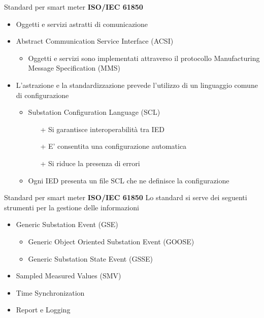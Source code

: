 \begin{frame}{Standard per smart meter}
\textbf{ISO/IEC 61850}
	\begin{itemize}[<+- | alert@+>]
		\item Oggetti e servizi astratti di comunicazione %
		\item Abstract Communication Service Interface (ACSI)
			\begin{itemize}[<+- | alert@+>]
				\item Oggetti e servizi sono implementati attraverso il protocollo Manufacturing Message Specification (MMS) %
			\end{itemize}
		\item L'astrazione e la standardizzazione prevede l'utilizzo di un linguaggio comune di configurazione
		\begin{itemize}[<+- | alert@+>]
			\item Substation Configuration Language (SCL)%
			\begin{itemize}[<+- | alert@+>]
			\item[+] Si garantisce interoperabilità tra IED
			\item[+] E' consentita una configurazione automatica
			\item[+] Si riduce la presenza di errori
			\end{itemize}
			\item Ogni IED presenta un file SCL che ne definisce la configurazione
		\end{itemize}
	\end{itemize}		
\end{frame}


\begin{frame}{Standard per smart meter}
\textbf{ISO/IEC 61850}
\newline
Lo standard si serve dei seguenti strumenti per la gestione delle informazioni
\begin{itemize}[<+- | alert@+>]
	\item Generic Substation Event (GSE)
	\begin{itemize}[<+- | alert@+>]
		\item Generic Object Oriented Substation Event (GOOSE)
		\item Generic Substation State Event (GSSE)
	\end{itemize}
	\item Sampled Measured Values (SMV)
	\item Time Synchronization
	\item Report e Logging
\end{itemize}
\end{frame}

